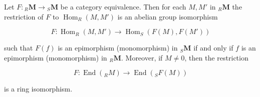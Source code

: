 Let $F: {}_R \mathbf{M} \to {}_S \mathbf{M}$ be a category equivalence. Then for each $M, M'$ in ${}_R \mathbf{M}$ the restriction of $F$ to $\operatorname{Hom}_R(M, M')$ is an abelian group isomorphism

$$F: \operatorname{Hom}_R(M, M') \to \operatorname{Hom}_S(F(M), F(M'))$$

such that $F(f)$ is an epimorphism (monomorphism) in ${}_S \mathbf{M}$ if and only if $f$ is an epimorphism (monomorphism) in ${}_R \mathbf{M}$. Moreover, if $M \neq 0$, then the restriction

$$F: \operatorname{End}({}_R M) \to \operatorname{End}({}_S F(M))$$

is a ring isomorphism.
